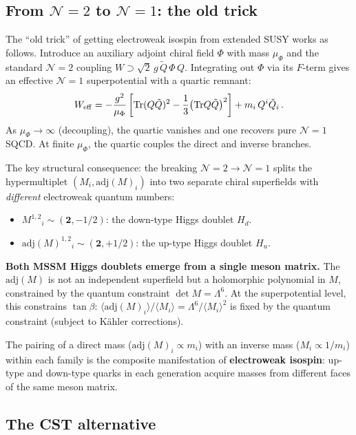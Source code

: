 \documentclass[12pt,a4paper]{article}
\newcommand{\Tr}{\mathrm{Tr}}
\newcommand{\adj}{\mathrm{adj}}
\begin{document}
\subsection{From $\mathcal{N}{=}2$ to $\mathcal{N}{=}1$:
  the old trick}

The ``old trick'' of getting electroweak isospin from extended
SUSY works as follows.
Introduce an auxiliary adjoint chiral field $\Phi$ with
mass $\mu_\Phi$ and the standard $\mathcal{N}{=}2$ coupling
$W \supset \sqrt{2}\,g\,\tilde{Q}\,\Phi\,Q$.
Integrating out $\Phi$ via its $F$-term gives an effective
$\mathcal{N}{=}1$ superpotential with a quartic remnant:
\begin{equation}
  W_{\rm eff} = -\frac{g^2}{\mu_\Phi}
    \left[\Tr(Q\tilde{Q})^2
    - \frac{1}{3}\bigl(\Tr Q\tilde{Q}\bigr)^2\right]
    + m_i\,Q^i\tilde{Q}_i\,.
  \label{eq:Weff}
\end{equation}
As $\mu_\Phi \to \infty$ (decoupling), the quartic vanishes and
one recovers pure $\mathcal{N}{=}1$ SQCD.
At finite $\mu_\Phi$, the quartic couples the direct and inverse
branches.

The key structural consequence: the breaking
$\mathcal{N}{=}2 \to \mathcal{N}{=}1$ splits the hypermultiplet
$(M_i, \adj(M)_i)$ into two separate chiral superfields with
\emph{different} electroweak quantum numbers:
\begin{itemize}
  \item $M^{1,2}{}_i \sim (\mathbf{2}, -1/2)$:
    the down-type Higgs doublet $H_d$.
  \item $\adj(M)^{1,2}{}_i \sim (\mathbf{2}, +1/2)$:
    the up-type Higgs doublet $H_u$.
\end{itemize}
\textbf{Both MSSM Higgs doublets emerge from a single meson
matrix.}
The $\adj(M)$ is not an independent superfield but a holomorphic
polynomial in $M$, constrained by the quantum constraint
$\det M = \Lambda^6$.
At the superpotential level, this constrains $\tan\beta$:
$\langle\adj(M)_i\rangle / \langle M_i\rangle
= \Lambda^6 / \langle M_i\rangle^2$ is fixed by the quantum
constraint (subject to K\"ahler corrections).

The pairing of a direct mass ($\adj(M)_i \propto m_i$) with
an inverse mass ($M_i \propto 1/m_i$) within each family is
the composite manifestation of \textbf{electroweak isospin}:
up-type and down-type quarks in each generation acquire masses
from different faces of the same meson matrix.

\subsection{The CST alternative}
\end{document}
